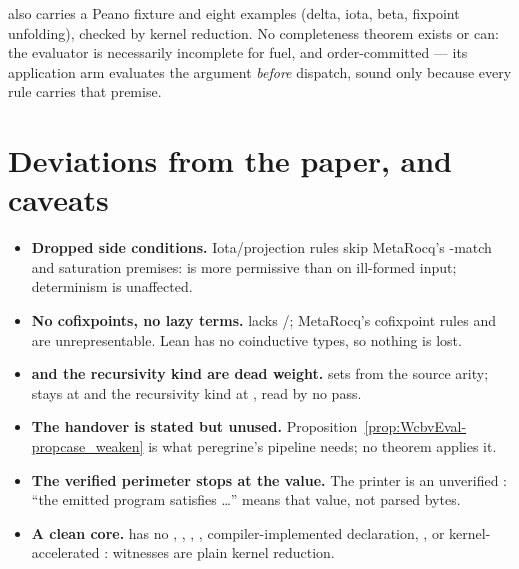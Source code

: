 \begin{remark}
  also carries a Peano fixture and eight examples (delta, iota, beta, fixpoint unfolding), checked by kernel reduction. No completeness theorem exists or can: the evaluator is necessarily incomplete for fuel, and order-committed --- its application arm evaluates the argument \emph{before} dispatch, sound only because every rule carries that premise.
\end{remark}

\section*{Deviations from the paper, and caveats}

\begin{itemize}
\item \textbf{Dropped side conditions.} Iota/projection rules skip MetaRocq's -match and saturation premises: \WcbvEval{} is more permissive than  on ill-formed input; determinism is unaffected.
\item \textbf{No cofixpoints, no lazy terms.}  lacks /; MetaRocq's cofixpoint rules and  are unrepresentable. Lean has no coinductive types, so nothing is lost.
\item \textbf{ and the recursivity kind are dead weight.}  sets  from the source arity;  stays at  and the recursivity kind at , read by no pass.
\item \textbf{The handover is stated but unused.} Proposition~\ref{prop:WcbvEval-propcase_weaken} is what peregrine's pipeline needs; no theorem applies it.
\item \textbf{The verified perimeter stops at the  value.} The printer is an unverified : ``the emitted program satisfies \ldots'' means that value, not parsed bytes.
\item \textbf{A clean core.}  has no , , , , compiler-implemented declaration, , or kernel-accelerated : witnesses are plain kernel reduction.
\end{itemize}
